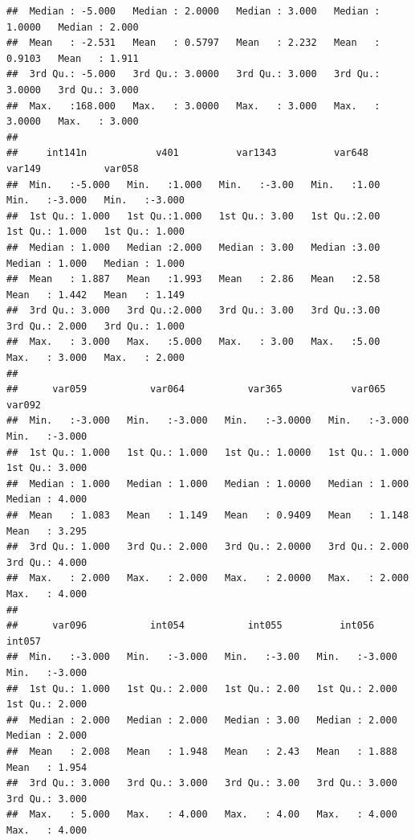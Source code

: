\documentclass[
]{book}
\begin{document}
\begin{verbatim}
##  Median : -5.000   Median : 2.0000   Median : 3.000   Median : 1.0000   Median : 2.000  
##  Mean   : -2.531   Mean   : 0.5797   Mean   : 2.232   Mean   : 0.9103   Mean   : 1.911  
##  3rd Qu.: -5.000   3rd Qu.: 3.0000   3rd Qu.: 3.000   3rd Qu.: 3.0000   3rd Qu.: 3.000  
##  Max.   :168.000   Max.   : 3.0000   Max.   : 3.000   Max.   : 3.0000   Max.   : 3.000  
##                                                                                         
##     int141n            v401          var1343          var648         var149           var058      
##  Min.   :-5.000   Min.   :1.000   Min.   :-3.00   Min.   :1.00   Min.   :-3.000   Min.   :-3.000  
##  1st Qu.: 1.000   1st Qu.:1.000   1st Qu.: 3.00   1st Qu.:2.00   1st Qu.: 1.000   1st Qu.: 1.000  
##  Median : 1.000   Median :2.000   Median : 3.00   Median :3.00   Median : 1.000   Median : 1.000  
##  Mean   : 1.887   Mean   :1.993   Mean   : 2.86   Mean   :2.58   Mean   : 1.442   Mean   : 1.149  
##  3rd Qu.: 3.000   3rd Qu.:2.000   3rd Qu.: 3.00   3rd Qu.:3.00   3rd Qu.: 2.000   3rd Qu.: 1.000  
##  Max.   : 3.000   Max.   :5.000   Max.   : 3.00   Max.   :5.00   Max.   : 3.000   Max.   : 2.000  
##                                                                                                   
##      var059           var064           var365            var065           var092      
##  Min.   :-3.000   Min.   :-3.000   Min.   :-3.0000   Min.   :-3.000   Min.   :-3.000  
##  1st Qu.: 1.000   1st Qu.: 1.000   1st Qu.: 1.0000   1st Qu.: 1.000   1st Qu.: 3.000  
##  Median : 1.000   Median : 1.000   Median : 1.0000   Median : 1.000   Median : 4.000  
##  Mean   : 1.083   Mean   : 1.149   Mean   : 0.9409   Mean   : 1.148   Mean   : 3.295  
##  3rd Qu.: 1.000   3rd Qu.: 2.000   3rd Qu.: 2.0000   3rd Qu.: 2.000   3rd Qu.: 4.000  
##  Max.   : 2.000   Max.   : 2.000   Max.   : 2.0000   Max.   : 2.000   Max.   : 4.000  
##                                                                                       
##      var096           int054           int055          int056           int057      
##  Min.   :-3.000   Min.   :-3.000   Min.   :-3.00   Min.   :-3.000   Min.   :-3.000  
##  1st Qu.: 1.000   1st Qu.: 2.000   1st Qu.: 2.00   1st Qu.: 2.000   1st Qu.: 2.000  
##  Median : 2.000   Median : 2.000   Median : 3.00   Median : 2.000   Median : 2.000  
##  Mean   : 2.008   Mean   : 1.948   Mean   : 2.43   Mean   : 1.888   Mean   : 1.954  
##  3rd Qu.: 3.000   3rd Qu.: 3.000   3rd Qu.: 3.00   3rd Qu.: 3.000   3rd Qu.: 3.000  
##  Max.   : 5.000   Max.   : 4.000   Max.   : 4.00   Max.   : 4.000   Max.   : 4.000  

\end{verbatim}
\end{document}
